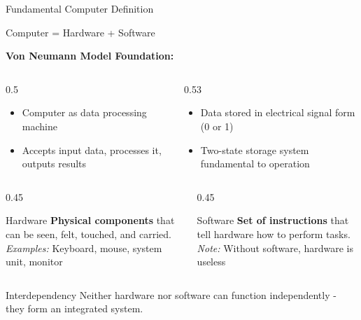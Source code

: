\documentclass[aspectratio=169]{beamer}
\begin{document}
\begin{frame}{Fundamental Computer Definition}
    \begin{definition}
        Computer = Hardware + Software
    \end{definition}
    
    \textbf{Von Neumann Model Foundation:}

      \begin{columns}
        \begin{column}{0.5\textwidth}
              \begin{itemize}
        \item Computer as data processing machine
        \item Accepts input data, processes it, outputs results 
    \end{itemize}
        \end{column}
         \begin{column}{0.53\textwidth}
             \begin{itemize}
       
        \item Data stored in electrical signal form (0 or 1)
        \item Two-state storage system fundamental to operation
    \end{itemize}
        \end{column}

        \end{columns}
    
    
    \begin{columns}
        \begin{column}{0.45\textwidth}
        \small
            \begin{block}{Hardware}
                \textbf{Physical components} that can be seen, felt, touched, and carried.
                \\
                \textit{Examples:} Keyboard, mouse, system unit, monitor
            \end{block}
        \end{column}
        \begin{column}{0.45\textwidth}
        \small
            \begin{block}{Software}
                \textbf{Set of instructions} that tell hardware how to perform tasks.
                \\
                \textit{Note:} Without software, hardware is useless
            \end{block}
        \end{column}
    \end{columns}
    
    \begin{alertblock}{Interdependency}
        Neither hardware nor software can function independently - they form an integrated system.
    \end{alertblock}
\end{frame}
\end{document}
